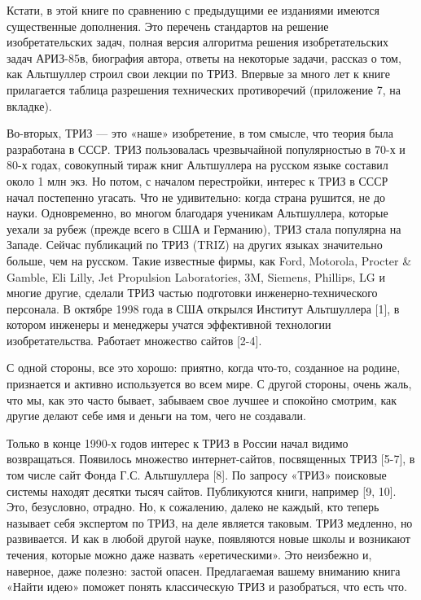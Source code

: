 Кстати,  в  этой  книге  по   сравнению  с  предыдущими  ее  изданиями
имеются   существенные   дополнения.   Это  перечень   стандартов   на
решение  изобретательских  задач,   полная  версия  алгоритма  решения
изобретательских задач АРИЗ-85в, биография автора, ответы на некоторые
задачи,  рассказ  о   том,  как  Альтшуллер  строил   свои  лекции  по
ТРИЗ.  Впервые за  много лет  к книге  прилагается таблица  разрешения
технических противоречий (приложение 7, на вкладке).

Во-вторых, ТРИЗ  — это  «наше» изобретение, в  том смысле,  что теория
была разработана в СССР.  ТРИЗ пользовалась чрезвычайной популярностью
в  70-х и  80-х годах,  совокупный тираж  книг Альтшуллера  на русском
языке  составил около  1 млн  экз.  Но потом,  с началом  перестройки,
интерес к  ТРИЗ в СССР  начал постепенно угасать. Что  не удивительно:
когда страна рушится,  не до науки. Одновременно,  во многом благодаря
ученикам Альтшуллера,  которые уехали за  рубеж (прежде всего в  США и
Германию), ТРИЗ стала  популярна на Западе. Сейчас  публикаций по ТРИЗ
(TRIZ)  на других  языках значительно  больше, чем  на русском.  Такие
известные фирмы, как Ford, Motorola,  Procter & Gamble, Eli Lilly, Jet
Propulsion Laboratories,  3M, Siemens,  Phillips, LG и  многие другие,
сделали  ТРИЗ частью  подготовки  инженерно-технического персонала.  В
октябре 1998 года  в США открылся Институт Альтшуллера  [1], в котором
инженеры и  менеджеры учатся эффективной  технологии изобретательства.
Работает множество сайтов [2-4].

С одной стороны,  все это хорошо: приятно, когда  что-то, созданное на
родине,  признается и  активно  используется во  всем  мире. С  другой
стороны,  очень жаль,  что мы,  как  это часто  бывает, забываем  свое
лучшее и спокойно смотрим, как другие делают себе имя и деньги на том,
чего не создавали.

Только  в конце  1990-х годов  интерес к  ТРИЗ в  России начал  видимо
возвращаться.  Появилось множество  интернет-сайтов, посвященных  ТРИЗ
[5-7], в том числе сайт Фонда  Г.С. Альтшуллера [8]. По запросу «ТРИЗ»
поисковые  системы находят  десятки тысяч  сайтов. Публикуются  книги,
например [9, 10]. Это, безусловно, отрадно. Но, к сожалению, далеко не
каждый, кто теперь  называет себя экспертом по ТРИЗ,  на деле является
таковым. ТРИЗ  медленно, но развивается.  И как в любой  другой науке,
появляются новые школы и возникают течения, которые можно даже назвать
«еретическими».  Это  неизбежно  и,  наверное,  даже  полезно:  застой
опасен. Предлагаемая вашему вниманию книга «Найти идею» поможет понять
классическую ТРИЗ и разобраться, что есть что.


